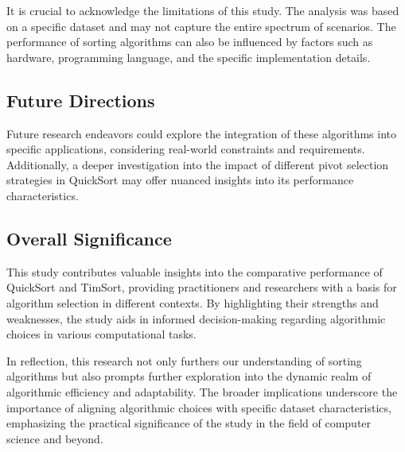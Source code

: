 \documentclass[a4paper, 9pt, twocolumn]{article}
\begin{document}
It is crucial to acknowledge the limitations of this study. The analysis was based on a specific dataset and may not capture the entire spectrum of scenarios. The performance of sorting algorithms can also be influenced by factors such as hardware, programming language, and the specific implementation details.

\subsection*{Future Directions}

Future research endeavors could explore the integration of these algorithms into specific applications, considering real-world constraints and requirements. Additionally, a deeper investigation into the impact of different pivot selection strategies in QuickSort may offer nuanced insights into its performance characteristics.

\subsection*{Overall Significance}

This study contributes valuable insights into the comparative performance of QuickSort and TimSort, providing practitioners and researchers with a basis for algorithm selection in different contexts. By highlighting their strengths and weaknesses, the study aids in informed decision-making regarding algorithmic choices in various computational tasks.

In reflection, this research not only furthers our understanding of sorting algorithms but also prompts further exploration into the dynamic realm of algorithmic efficiency and adaptability. The broader implications underscore the importance of aligning algorithmic choices with specific dataset characteristics, emphasizing the practical significance of the study in the field of computer science and beyond.

\newpage


\end{document}

